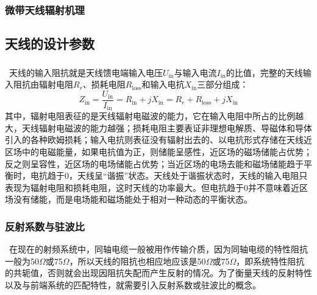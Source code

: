 \documentclass{article}
\newcommand{\tmop}[1]{\ensuremath{\operatorname{#1}}}
\newcommand{\tmtextit}[1]{{\itshape{#1}}}
\newcommand{\tmtextup}[1]{{\upshape{#1}}}
\begin{document}
\subsubsection{微带天线辐射机理}



\subsection{天线的设计参数}

\subsubsection{\tmtextit{\tmtextup{输入阻抗}}}

\
天线的输入阻抗就是天线馈电端输入电压$U_{\tmop{in}}$与输入电流$I_{\tmop{in}}$的比值，完整的天线输入阻抗由辐射电阻$R_r$、损耗电阻$R_{\tmop{loss}}$和输入电抗$X_{\tmop{in}}$三部分组成：
\[ Z_{\tmop{in}} = \frac{U_{\tmop{in}}}{I_{\tmop{in}}} = R_{\tmop{in}} + j
   X_{\tmop{in}} = R_r + R_{\tmop{loss}} + j X_{\tmop{in}} \]
其中，辐射电阻表征的是天线辐射电磁波的能力，它在输入电阻中所占的比例越大，天线辐射电磁波的能力越强；损耗电阻主要表证非理想电解质、导磁体和导体引入的各种欧姆损耗；输入电抗则表征没有辐射出去的、以电抗形式存储在天线近区场中的电磁能量，如果电抗值为正，则储能呈感性，近区场的磁场储能占优势；反之则呈容性，近区场的电场储能占优势；当近区场的电场去能和磁场储能趋于平衡时，电抗趋于0，天线呈“谐振”状态。天线处于谐振状态时，天线的输入电阻只表现为辐射电阻和损耗电阻，这时天线的功率最大。但电抗趋于0并不意味着近区场没有储能，而是电场能和磁场能处于相对一种动态的平衡状态。

\subsubsection{反射系数与驻波比}

\
在现在的射频系统中，同轴电缆一般被用作传输介质，因为同轴电缆的特性阻抗一般为50$\Omega$或75$\Omega$，所以天线的阻抗也相应地应该是50$\Omega$或75$\Omega$，即系统特性阻抗的共轭值，否则就会出现因阻抗失配而产生反射的情况。为了衡量天线的反射特性以及与前端系统的匹配特性，就需要引入反射系数或驻波比的概念。
\end{document}
